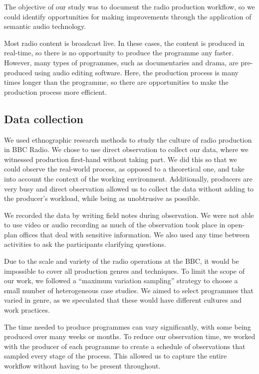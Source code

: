 
The objective of our study was to document the radio production workflow, so we could identify opportunities for making
improvements through the application of semantic audio technology.

Most radio content is broadcast live. In these cases, the content is produced in real-time, so there is no opportunity
to produce the programme any faster. However, many types of programmes, such as documentaries and drama, are
pre-produced using audio editing software. Here, the production process is many times longer than the programme, so
there are opportunities to make the production process more efficient.

\subsection{Data collection}
We used ethnographic research methods to study the culture of radio production in BBC Radio. We chose to use direct
observation to collect our data, where we witnessed production first-hand without taking part.  We did this so that we
could observe the real-world process, as opposed to a theoretical one, and take into account the context of the working
environment. Additionally, producers are very busy and direct observation allowed us to collect the data without adding
to the producer's workload, while being as unobtrusive as possible.

We recorded the data by writing field notes during observation. We were not able to use video or audio recording as
much of the observation took place in open-plan offices that deal with sensitive information. We also used any time
between activities to ask the participants clarifying questions.

Due to the scale and variety of the radio operations at the BBC, it would be impossible to cover all production genres
and techniques. To limit the scope of our work, we followed a ``maximum variation sampling'' strategy \citep[p.
172]{Patton1990} to choose a small number of heterogeneous case studies. We aimed to select programmes that varied in
genre, as we speculated that these would have different cultures and work practices.

The time needed to produce programmes can vary significantly, with some being produced over many weeks or months. To
reduce our observation time, we worked with the producer of each programme to create a schedule of observations that
sampled every stage of the process. This allowed us to capture the entire workflow without having to be present
throughout.

